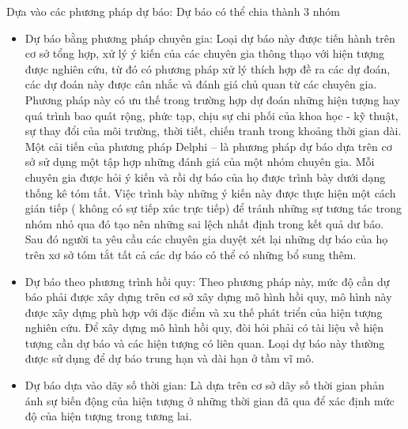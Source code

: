 Dựa vào các phương pháp dự báo: Dự báo có thể chia thành 3 nhóm
\begin{itemize}
    \item Dự báo bằng phương pháp chuyên gia: Loại dự báo này được tiến hành trên cơ sở tổng hợp, xử lý ý kiến của các chuyên gia thông thạo với hiện tượng được nghiên cứu, từ đó có phương pháp xử lý thích hợp đề ra các dự đoán, các dự đoán này được cân nhắc và đánh giá chủ quan từ các chuyên gia. Phương pháp này có ưu thế trong trường hợp dự đoán những hiện tượng hay quá trình bao quát rộng, phức tạp, chịu sự chi phối của khoa học - kỹ thuật, sự thay đổi của môi trường, thời tiết, chiến tranh trong khoảng thời gian dài. Một cải tiến của phương pháp Delphi – là phương pháp dự báo dựa trên cơ sở sử dụng một tập hợp những đánh giá của một nhóm chuyên gia. Mỗi chuyên gia được hỏi ý kiến và rồi dự báo của họ được trình bày dưới dạng thống kê tóm tắt. Việc trình bày những ý kiến này được thực hiện một cách gián tiếp ( không có sự tiếp xúc trực tiếp) để tránh những sự tương tác trong nhóm nhỏ qua đó tạo nên những sai lệch nhất định trong kết quả dư báo. Sau đó người ta yêu cầu các chuyên gia duyệt xét lại những dự báo của họ trên xơ sở tóm tắt tất cả các dự báo có thể có những bổ sung thêm. \\
    \item Dự báo theo phương trình hồi quy: Theo phương pháp này, mức độ cần dự báo phải được xây dựng trên cơ sở xây dựng mô hình hồi quy, mô hình này được xây dựng phù hợp với đặc điểm và xu thế phát triển của hiện tượng nghiên cứu. Để xây dựng mô hình hồi quy, đòi hỏi phải có tài liệu về hiện tượng cần dự báo và các hiện tượng có liên quan. Loại dự báo này thường được sử dụng để dự báo trung hạn và dài hạn ở tầm vĩ mô.
    \item Dự báo dựa vào dãy số thời gian: Là dựa trên cơ sở dãy số thời gian phản ánh sự biến động của hiện tượng ở những thời gian đã qua để xác định mức độ của hiện tượng trong tương lai.
\end{itemize}
